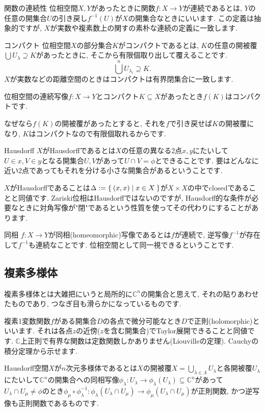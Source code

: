 \documentclass{jsarticle}
\newcommand{\CC}{\mathbb{C}}
\theoremstyle{definition}
\newcommand{\mydescription}[1]{
\begin{description}
\setlength{\itemindent}{2zw}
\setlength{\leftskip}{-2zw}
\setlength{\labelsep}{1zw}
#1
\end{description}
}
\numberwithin{theorem}{section}
\begin{document}
\mydescription{
\item[関数の連続性] 位相空間$X, Y$があったときに関数$f: X \rightarrow Y$が連続であるとは, $Y$の任意の開集合$U$の引き戻し$f^{-1}(U)$が$X$の開集合なときにいいます.
この定義は抽象的ですが, $X$が実数や複素数上の関すの素朴な連続の定義に一致します.

\item[コンパクト] 位相空間$X$の部分集合$K$がコンパクトであるとは, $K$の任意の開被覆$\bigcup U_\lambda \supseteq K$があったときに, そこから有限個取り出して覆えることです.
\[
\bigcup^n U_{\lambda_i} \supseteq K.
\]
$X$が実数などの距離空間のときはコンパクトは有界閉集合に一致します.

位相空間の連続写像$f: X \rightarrow Y$とコンパクト$K\subseteq X$があったとき$f(K)$はコンパクトです.

なぜなら$f(K)$の開被覆があったとすると, それを$f$で引き戻せば$K$の開被覆になり, $K$はコンパクトなので有限個取れるからです.

\item[Hausdorff] $X$がHausdorffであるとは$X$の任意の異なる2点$x, y$にたいして$U \in x, V \in y$となる開集合$U, V$があって$U \cap V = \phi$とできることです. 要はどんなに近い2点であってもそれを分ける小さな開集合があるということです.

$X$がHausdorffであることは$\Delta := \Set{(x, x) | x \in X}$が$X \times X$の中でclosedであることと同値です. Zariski位相はHausdorffではないのですが, Hausdorff的な条件が必要なときに対角写像が"閉"であるという性質を使ってその代わりにすることがあります.

\item[同相] $f: X \rightarrow Y$が同相(homeomorphic)写像であるとは$f$が連続で, 逆写像$f^{-1}$が存在して$f^{-1}$も連続なことです. 位相空間として同一視できるということです.
}

\subsection{複素多様体}
複素多様体とは大雑把にいうと局所的に$\CC^n$の開集合と思えて, それの貼りあわせたものであり, つなぎ目も滑らかになっているものです.

複素1変数関数$f$がある開集合$D$の各点で微分可能なとき$D$で正則(holomorphic)といいます. それは各点$z$の近傍($z$を含む開集合)でTaylor展開できることと同値です. $\CC$上正則で有界な関数は定数関数しかありません(Liouvilleの定理). Cauchyの積分定理から示せます.

 Hausdorff空間$X$が$n$次元多様体であるとは$X$の開被覆$X = \bigcup_{\lambda \in \Lambda} U_\lambda$と各開被覆$U_\lambda$にたいして$\CC^n$の開集合への同相写像$\phi_\lambda : U_\lambda \rightarrow \phi_\lambda(U_\lambda) \subseteq \CC^n$があって$U_\lambda \cap U_\mu \neq \phi$のとき$\phi_\mu\circ\phi_\lambda^{-1} : \phi_\lambda(U_\lambda\cap U_\mu) \rightarrow \phi_\mu(U_\lambda\cap U_\mu)$が正則関数, かつ逆写像も正則関数であるものです.
\end{document}
